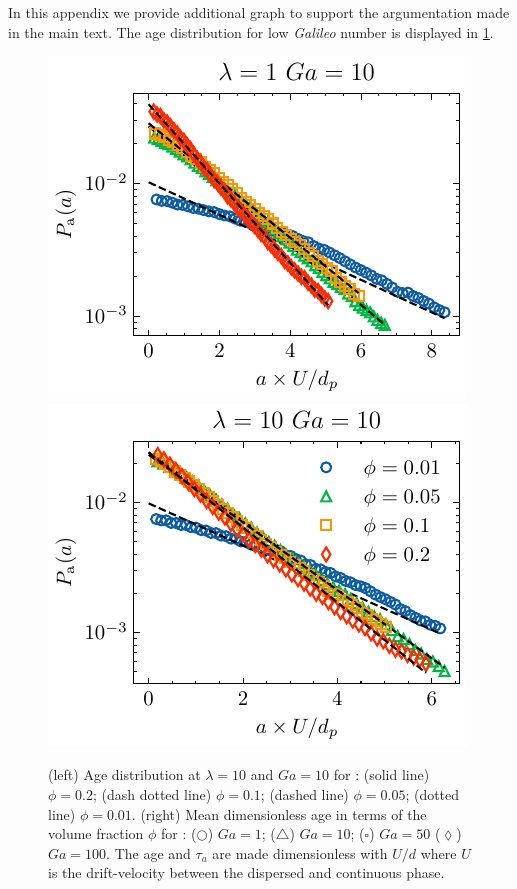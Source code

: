 In this appendix we provide additional graph to support the argumentation made in the main text. 
The age distribution for low \textit{Galileo} number is displayed in \ref{fig:age_picture_low_ga}. 
\begin{figure}[h!]
    \centering
    \includegraphics[height = 0.3\textwidth]{image/HOMOGENEOUS_NEW/Dist/Pa_l_1_Ga_10.pdf}
    \includegraphics[height = 0.3\textwidth]{image/HOMOGENEOUS_NEW/Dist/Pa_l_10_Ga_10.pdf}
    \caption{(left) Age distribution at $\lambda = 10$ and $Ga = 10$ for : (solid line) $\phi = 0.2$; (dash dotted line) $\phi = 0.1$; (dashed line) $\phi =0.05$; (dotted line) $\phi = 0.01$. 
    (right) Mean dimensionless age in terms of the volume fraction $\phi$ for : 
    ($\pmb\bigcirc$) $Ga=1$; ($\pmb\triangle$) $ Ga = 10$; ($\pmb\square$) $Ga = 50$ ($\pmb\lozenge$) $Ga =100$.
    The age and $\tau_a$ are made dimensionless with $U/d$ where $U$ is the drift-velocity between the dispersed and continuous phase.  }
    \label{fig:age_picture_low_ga}
\end{figure}